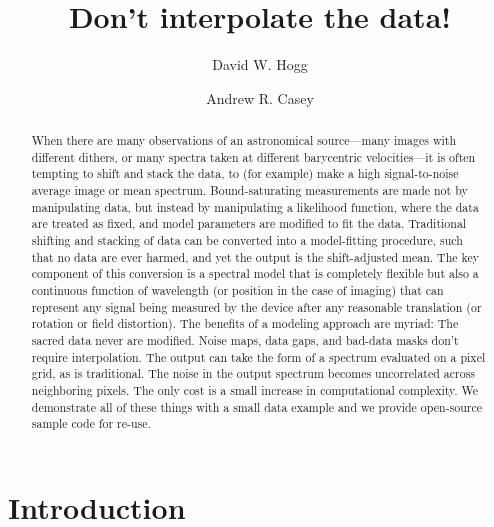 \documentclass[modern]{aastex631}
\begin{document}
\title{\Large Don't interpolate the data!}

\author[0000-0003-2866-9403]{David W. Hogg}

\author[0000-0003-0174-0564]{Andrew R. Casey}

\begin{abstract}\noindent
When there are many observations of an astronomical source---many images with different dithers, or many spectra taken at different barycentric velocities---it is often tempting to shift and stack the data, to (for example) make a high signal-to-noise average image or mean spectrum.
Bound-saturating measurements are made not by manipulating data, but instead by manipulating a likelihood function, where the data are treated as fixed, and model parameters are modified to fit the data.
Traditional shifting and stacking of data can be converted into a model-fitting procedure, such that no data are ever harmed, and yet the output is the shift-adjusted mean.
The key component of this conversion is a spectral model that is completely flexible but also a continuous function of wavelength (or position in the case of imaging) that can represent any signal being measured by the device after any reasonable translation (or rotation or field distortion).
The benefits of a modeling approach are myriad:
The sacred data never are modified.
Noise maps, data gaps, and bad-data masks don't require interpolation.
The output can take the form of a spectrum evaluated on a pixel grid, as is traditional.
The noise in the output spectrum becomes uncorrelated across neighboring pixels. 
The only cost is a small increase in computational complexity.
We demonstrate all of these things with a small data example and we provide open-source sample code for re-use.
\end{abstract}


\section*{}\clearpage
\section{Introduction}\label{sec:intro}
\end{document}
